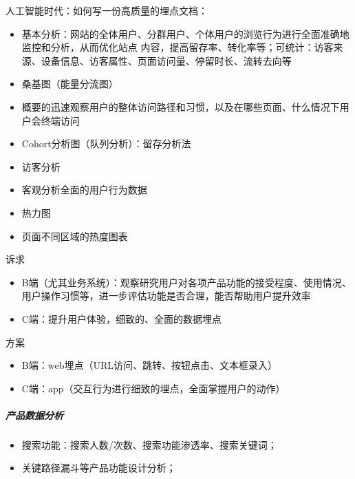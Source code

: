 \documentclass[letterpaper,10pt,english]{sphinxmanual}
\begin{document}
人工智能时代：如何写一份高质量的埋点文档：

\begin{itemize}
\item {} 
基本分析：网站的全体用户、分群用户、个体用户的浏览行为进行全面准确地监控和分析，从而优化站点
内容，提高留存率、转化率等；可统计：访客来源、设备信息、访客属性、页面访问量、停留时长、流转去向等

\item {} 
桑基图（能量分流图）

\item {} 
概要的迅速观察用户的整体访问路径和习惯，以及在哪些页面、什么情况下用户会终端访问

\item {} 
Cohort分析图（队列分析）：留存分析法

\item {} 
访客分析

\item {} 
客观分析全面的用户行为数据

\item {} 
热力图

\item {} 
页面不同区域的热度图表

\end{itemize}


诉求
\begin{itemize}
\item {} 
B端（尤其业务系统）：观察研究用户对各项产品功能的接受程度、使用情况、用户操作习惯等，进一步评估功能是否合理，能否帮助用户提升效率

\item {} 
C端：提升用户体验，细致的、全面的数据埋点

\end{itemize}

方案
\begin{itemize}
\item {} 
B端：web埋点（URL访问、跳转、按钮点击、文本框录入）

\item {} 
C端：app（交互行为进行细致的埋点，全面掌握用户的动作）

\end{itemize}


\subparagraph{产品数据分析}
\label{\detokenize{chapter_knowledge/data_analysis:id14}}\begin{itemize}
\item {} 
搜索功能：搜索人数/次数、搜索功能渗透率、搜索关键词；

\item {} 
关键路径漏斗等产品功能设计分析；

\end{itemize}
\end{document}
